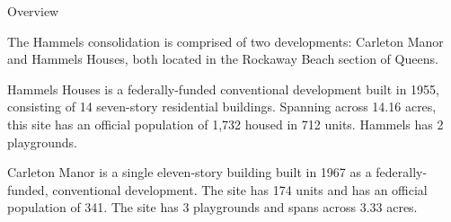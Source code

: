 Overview 

The Hammels consolidation is comprised of two developments: Carleton Manor and Hammels Houses, both located in the Rockaway Beach section of Queens. 

Hammels Houses is a federally-funded conventional development built in 1955, consisting of 14 seven-story residential buildings. Spanning across 14.16 acres, this site has an official population of 1,732 housed in 712 units. Hammels has 2 playgrounds. 

Carleton Manor is a single eleven-story building built in 1967 as a federally-funded, conventional development. The site has 174 units and has an official population of 341. The site has 3 playgrounds and spans across 3.33 acres. 